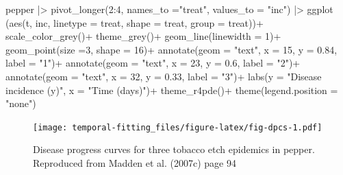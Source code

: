 \documentclass[
  letterpaper,
]{book}
\newenvironment{Shaded}{\begin{snugshade}}{\end{snugshade}}
\newcommand{\AttributeTok}[1]{\textcolor[rgb]{0.40,0.45,0.13}{#1}}
\newcommand{\DecValTok}[1]{\textcolor[rgb]{0.68,0.00,0.00}{#1}}
\newcommand{\FloatTok}[1]{\textcolor[rgb]{0.68,0.00,0.00}{#1}}
\newcommand{\FunctionTok}[1]{\textcolor[rgb]{0.28,0.35,0.67}{#1}}
\newcommand{\NormalTok}[1]{\textcolor[rgb]{0.00,0.23,0.31}{#1}}
\newcommand{\SpecialCharTok}[1]{\textcolor[rgb]{0.37,0.37,0.37}{#1}}
\newcommand{\StringTok}[1]{\textcolor[rgb]{0.13,0.47,0.30}{#1}}
\begin{document}
\begin{Shaded}
\begin{Highlighting}[]
\NormalTok{pepper }\SpecialCharTok{|\textgreater{}} 
  \FunctionTok{pivot\_longer}\NormalTok{(}\DecValTok{2}\SpecialCharTok{:}\DecValTok{4}\NormalTok{, }\AttributeTok{names\_to =}\StringTok{"treat"}\NormalTok{, }\AttributeTok{values\_to =} \StringTok{"inc"}\NormalTok{) }\SpecialCharTok{|\textgreater{}} 
  \FunctionTok{ggplot}\NormalTok{ (}\FunctionTok{aes}\NormalTok{(t, inc, }
              \AttributeTok{linetype =}\NormalTok{ treat, }
              \AttributeTok{shape =}\NormalTok{ treat, }
              \AttributeTok{group =}\NormalTok{ treat))}\SpecialCharTok{+}
  \FunctionTok{scale\_color\_grey}\NormalTok{()}\SpecialCharTok{+}
  \FunctionTok{theme\_grey}\NormalTok{()}\SpecialCharTok{+}
  \FunctionTok{geom\_line}\NormalTok{(}\AttributeTok{linewidth =} \DecValTok{1}\NormalTok{)}\SpecialCharTok{+}
  \FunctionTok{geom\_point}\NormalTok{(}\AttributeTok{size =}\DecValTok{3}\NormalTok{, }\AttributeTok{shape =} \DecValTok{16}\NormalTok{)}\SpecialCharTok{+}
  \FunctionTok{annotate}\NormalTok{(}\AttributeTok{geom =} \StringTok{"text"}\NormalTok{, }\AttributeTok{x =} \DecValTok{15}\NormalTok{, }\AttributeTok{y =} \FloatTok{0.84}\NormalTok{, }\AttributeTok{label =} \StringTok{"1"}\NormalTok{)}\SpecialCharTok{+}
  \FunctionTok{annotate}\NormalTok{(}\AttributeTok{geom =} \StringTok{"text"}\NormalTok{, }\AttributeTok{x =} \DecValTok{23}\NormalTok{, }\AttributeTok{y =} \FloatTok{0.6}\NormalTok{, }\AttributeTok{label =} \StringTok{"2"}\NormalTok{)}\SpecialCharTok{+}
  \FunctionTok{annotate}\NormalTok{(}\AttributeTok{geom =} \StringTok{"text"}\NormalTok{, }\AttributeTok{x =} \DecValTok{32}\NormalTok{, }\AttributeTok{y =} \FloatTok{0.33}\NormalTok{, }\AttributeTok{label =} \StringTok{"3"}\NormalTok{)}\SpecialCharTok{+}
  \FunctionTok{labs}\NormalTok{(}\AttributeTok{y =} \StringTok{"Disease incidence (y)"}\NormalTok{,}
       \AttributeTok{x =} \StringTok{"Time (days)"}\NormalTok{)}\SpecialCharTok{+}
  \FunctionTok{theme\_r4pde}\NormalTok{()}\SpecialCharTok{+}
  \FunctionTok{theme}\NormalTok{(}\AttributeTok{legend.position =} \StringTok{"none"}\NormalTok{)}
\end{Highlighting}
\end{Shaded}

\begin{figure}

{\centering \texttt{[image: temporal-fitting\_files/figure-latex/fig-dpcs-1.pdf]}

}

\caption{\label{fig-dpcs}Disease progress curves for three tobacco etch
epidemics in pepper. Reproduced from Madden et al. (2007c) page 94}

\end{figure}
\end{document}
